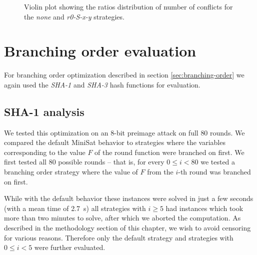 \begin{figure}
\caption{Violin plot showing the ratios distribution of number of conflicts for the \emph{none} and \emph{r0-S-x-y} strategies.}
\label{fig:bo-ratio-confl-none-r0sxy}
\end{figure}

\section{Branching order evaluation}
For branching order optimization described in section \ref{sec:branching-order} we again used the \emph{SHA-1} and \emph{SHA-3} hash functions for evaluation.

\subsection{SHA-1 analysis}
We tested this optimization on an $8$-bit preimage attack on full $80$ rounds. 
We compared the default MiniSat behavior to strategies where the variables corresponding to the value $F$ of the round function were branched on first.
We first tested all $80$ possible rounds -- that is, for every $0 \le i < 80$ we tested a branching order strategy where the value of $F$ from the $i$-th round was branched on first.

While with the default behavior these instances were solved in just a few seconds (with a mean time of \SI{2.7}{\second}) all strategies with $i \ge 5$ had instances which took more than two minutes to solve, after which we aborted the computation.
As described in the methodology section of this chapter, we wish to avoid censoring for various reasons.
Therefore only the default strategy and strategies with $0 \le i < 5$ were further evaluated.

%

